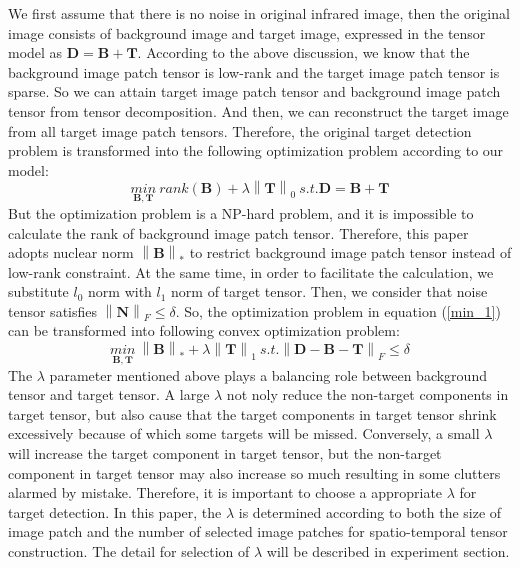 \documentclass[journal]{IEEEtran}
\begin{document}
We first assume that there is no noise in original infrared image, then the original image consists of background image and target image, expressed in the tensor model as $\bm{D}=\bm{B}+\bm{T}$. According to the above discussion, we know that the background image patch tensor is low-rank and the target image patch tensor is sparse. So we can attain target image patch tensor and background image patch tensor from tensor decomposition. And then, we can reconstruct the target image from all target image patch tensors. Therefore, the original target detection problem is transformed into the following optimization problem according to our model:
\begin{equation}
  \underset{\bm{B},\bm{T}}{min} \ rank(\bm{B}) + \lambda \left \| \bm{T} \right \|_0 \ s.t. \bm{D}=\bm{B}+\bm{T}
  \label{min_1}
\end{equation}
But the optimization problem is a NP-hard problem, and it is impossible to calculate the rank of background image patch tensor. Therefore, this paper adopts nuclear norm $\left \| \bm{B} \right \|_*$ to restrict background image patch tensor instead of low-rank constraint. At the same time, in order to facilitate the calculation, we substitute $l_0$ norm with $l_1$ norm of target tensor. Then, we consider that noise tensor satisfies $\left \| \bm{N}\right \|_F \leq \delta$. So, the optimization problem in equation (\ref{min_1}) can be transformed into following convex optimization problem:
\begin{equation}
  \underset{\bm{B},\bm{T}}{min} \ \left \| \bm{B} \right \|_* + \lambda \left \| \bm{T} \right \|_1 \ s.t. \left \|\bm{D}-\bm{B}-\bm{T} \right \|_F\leq \delta
  \label{min_2}
\end{equation}
The $\lambda$ parameter mentioned above plays a balancing role between background tensor and target tensor. A large $\lambda$ not noly reduce the non-target components in target tensor, but also cause that the target components in target tensor shrink excessively because of which some targets will be missed. Conversely, a small $\lambda$ will increase the target component in target tensor, but the non-target component in target tensor may also increase so much resulting in some clutters alarmed by mistake. Therefore, it is important to choose a appropriate $\lambda$ for target detection. In this paper, the $\lambda$ is determined according to both the size of image patch and the number of selected image patches for spatio-temporal tensor construction. The detail for selection of $\lambda$ will be described in experiment section.
\end{document}
